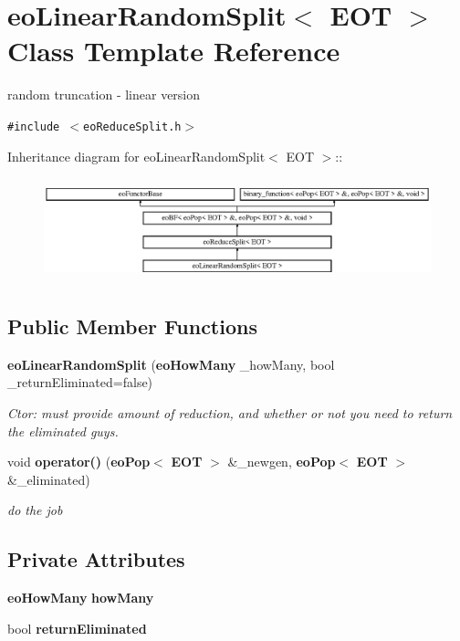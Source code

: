\section{eo\-Linear\-Random\-Split$<$ EOT $>$ Class Template Reference}
\label{classeo_linear_random_split}
random truncation - linear version  


{\tt \#include $<$eo\-Reduce\-Split.h$>$}

Inheritance diagram for eo\-Linear\-Random\-Split$<$ EOT $>$::\begin{figure}[H]
\begin{center}
\leavevmode
\includegraphics[height=3.01075cm]{classeo_linear_random_split}
\end{center}
\end{figure}
\subsection*{Public Member Functions}
\begin{CompactItemize}
\item 
{\bf eo\-Linear\-Random\-Split} ({\bf eo\-How\-Many} \_\-how\-Many, bool \_\-return\-Eliminated=false)\label{classeo_linear_random_split_a0}

\begin{CompactList}\small\item\em Ctor: must provide amount of reduction, and whether or not you need to return the eliminated guys. \item\end{CompactList}\item 
void {\bf operator()} ({\bf eo\-Pop}$<$ {\bf EOT} $>$ \&\_\-newgen, {\bf eo\-Pop}$<$ {\bf EOT} $>$ \&\_\-eliminated)\label{classeo_linear_random_split_a1}

\begin{CompactList}\small\item\em do the job \item\end{CompactList}\end{CompactItemize}
\subsection*{Private Attributes}
\begin{CompactItemize}
\item 
{\bf eo\-How\-Many} {\bf how\-Many}\label{classeo_linear_random_split_r0}

\item 
bool {\bf return\-Eliminated}\label{classeo_linear_random_split_r1}

\end{CompactItemize}


